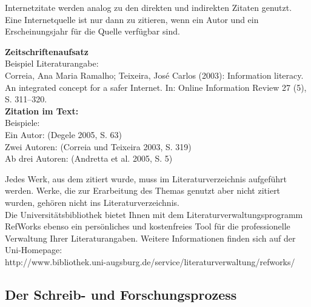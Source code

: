 Internetzitate werden analog zu den direkten und indirekten Zitaten genutzt. Eine Internetquelle ist nur dann zu zitieren, wenn ein Autor und ein Erscheinungsjahr für die Quelle verfügbar sind.\\

\begin{spacing}{1}

\textbf{Zeitschriftenaufsatz}\\

Beispiel Literaturangabe:\\

Correia, Ana Maria Ramalho; Teixeira, José Carlos (2003): Information literacy. An integrated concept for a safer Internet. In: Online Information Review 27 (5), S. 311–320.\\

\textbf{Zitation im Text:}\\

Beispiele:\\

Ein Autor: (Degele 2005, S. 63)\\
Zwei Autoren: (Correia und Teixeira 2003, S. 319)\\
Ab drei Autoren: (Andretta et al. 2005, S. 5)\\

\end{spacing}

Jedes Werk, aus dem zitiert wurde, muss im Literaturverzeichnis aufgeführt werden. Werke, die zur Erarbeitung des Themas genutzt aber nicht zitiert wurden, gehören nicht ins Literaturverzeichnis. \\

Die Universitätsbibliothek bietet Ihnen mit dem Literaturverwaltungsprogramm RefWorks ebenso ein persönliches und kostenfreies Tool für die professionelle Verwaltung Ihrer Literaturangaben. Weitere Informationen finden sich auf der Uni-Homepage:\\http://www.bibliothek.uni-augsburg.de/service/literaturverwaltung/refworks/









\clearpage


\subsection{Der Schreib- und Forschungsprozess}


